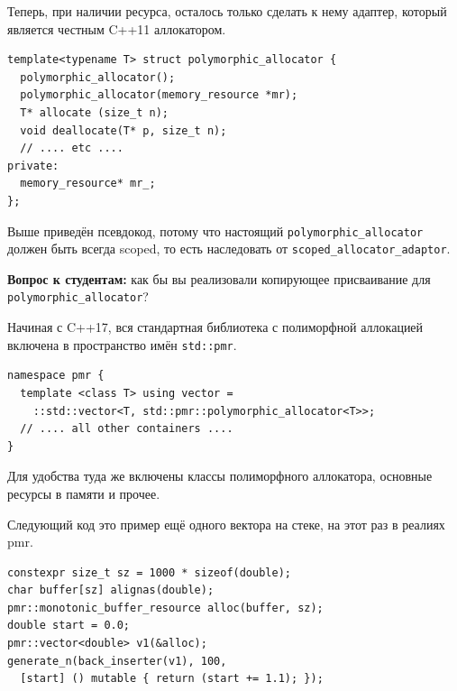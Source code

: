 \documentclass[a4paper,12pt,oneside]{book}
\newif\ifanswers
\begin{document}
Теперь, при наличии ресурса, осталось только сделать к нему адаптер, который является честным C++11 аллокатором.

\begin{lstlisting}
template<typename T> struct polymorphic_allocator {
  polymorphic_allocator();
  polymorphic_allocator(memory_resource *mr);
  T* allocate (size_t n);
  void deallocate(T* p, size_t n);
  // .... etc ....
private: 
  memory_resource* mr_;
};
\end{lstlisting}

Выше приведён псевдокод, потому что настоящий \lstinline!polymorphic_allocator! должен быть всегда scoped, то есть наследовать от \lstinline!scoped_allocator_adaptor!.

\textbf{Вопрос к студентам:} как бы вы реализовали копирующее присваивание для \lstinline!polymorphic_allocator!?

\ifanswers
Правильный ответ: тривиально запретить. Он же ограничен по области распространения и значит привязан к месту, а не к объекту.

Более тонкий вопрос тут что делать с конструктором копирования. На удивление самым разумным выбором будет оставить его по умолчанию, то есть копировать значение указателя на \lstinline!memory_resource! по значению. Приходите на мои лекции, там я разбираю ходы в этой позиции и показываю к чему приводят все остальные. Или сделайте это дома сами, тут не высшая математика, тут всё просто.
\fi

Начиная с C++17, вся стандартная библиотека с полиморфной аллокацией включена в пространство имён \lstinline!std::pmr!.

\begin{lstlisting}
namespace pmr {
  template <class T> using vector =
    ::std::vector<T, std::pmr::polymorphic_allocator<T>>;
  // .... all other containers ....
}
\end{lstlisting}

Для удобства туда же включены классы полиморфного аллокатора, основные ресурсы в памяти и прочее.

Следующий код это пример ещё одного вектора на стеке, на этот раз в реалиях pmr.

\begin{lstlisting}
constexpr size_t sz = 1000 * sizeof(double);
char buffer[sz] alignas(double);
pmr::monotonic_buffer_resource alloc(buffer, sz);
double start = 0.0;
pmr::vector<double> v1(&alloc);
generate_n(back_inserter(v1), 100, 
  [start] () mutable { return (start += 1.1); });
\end{lstlisting}
\end{document}
